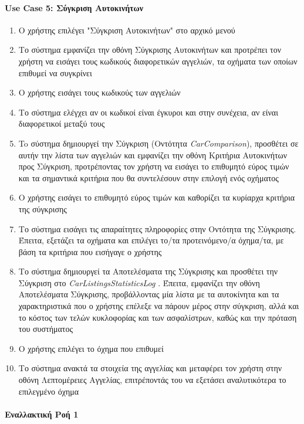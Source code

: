 \documentclass{../ol-softwaremanual}
\begin{document}
	
	
	\paragraph{\en Use Case 5: \gr Σύγκριση Αυτοκινήτων}
	\begin{enumerate}
		\item Ο χρήστης επιλέγει \en"\gr Σύγκριση Αυτοκινήτων\en" \gr στο αρχικό μενού
		\item Το σύστημα εμφανίζει την οθόνη Σύγκρισης Αυτοκινήτων και προτρέπει τον χρήστη να εισάγει τους κωδικούς διαφορετικών αγγελιών, τα οχήματα των οποίων επιθυμεί να συγκρίνει
		\item Ο χρήστης εισάγει τους κωδικούς των αγγελιών
		\item Το σύστημα ελέγχει αν οι κωδικοί είναι έγκυροι και στην συνέχεια, αν είναι διαφορετικοί μεταξύ τους
		\item To σύστημα δημιουργεί την Σύγκριση (Οντότητα \en \textit{CarComparison}\gr), προσθέτει σε αυτήν την λίστα των αγγελιών και εμφανίζει την οθόνη Κριτήρια Αυτοκινήτων προς Σύγκριση, προτρέποντας τον χρήστη να εισάγει το επιθυμητό εύρος τιμών και τα σημαντικά κριτήρια που θα συντελέσουν στην επιλογή ενός οχήματος
		\item Ο χρήστης εισάγει το επιθυμητό εύρος τιμών και καθορίζει τα κυρίαρχα κριτήρια της σύγκρισης
		\item Το σύστημα εισάγει τις απαραίτητες πληροφορίες στην Οντότητα της Σύγκρισης. Έπειτα, εξετάζει τα οχήματα και επιλέγει το/τα προτεινόμενο/α όχημα/τα, με βάση τα κριτήρια που εισήγαγε ο χρήστης
		\item Το σύστημα δημιουργεί τα Αποτελέσματα της Σύγκρισης και προσθέτει την Σύγκριση στο \en \textit{CarListingsStatisticsLog} \gr. Έπειτα, εμφανίζει την οθόνη Αποτελέσματα Σύγκρισης, προβάλλοντας μία λίστα με τα αυτοκίνητα και τα χαρακτηριστικά που ο χρήστης επέλεξε να πάρουν μέρος στην σύγκριση, αλλά και το κόστος των τελών κυκλοφορίας και των ασφαλίστρων, καθώς και την πρόταση του συστήματος 
		\item Ο χρήστης επιλέγει το όχημα που επιθυμεί
		\item Το σύστημα ανακτά τα στοιχεία της αγγελίας και μεταφέρει τον χρήστη στην οθόνη Λεπτομέρειες Αγγελίας, επιτρέποντάς του να εξετάσει αναλυτικότερα το επιλεγμένο όχημα
	\end{enumerate}
	
	\paragraph{Εναλλακτική Ροή 1}
	
\end{document}
